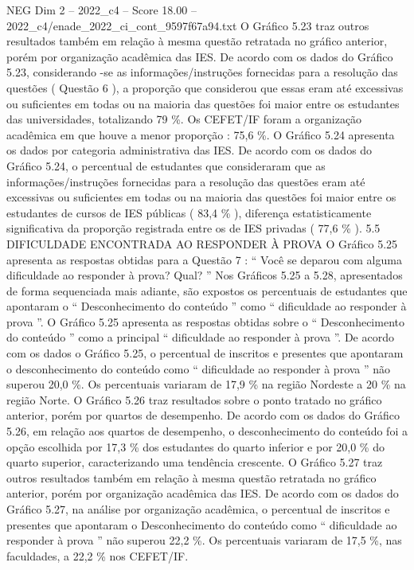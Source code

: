 \begin{textsample}{NEG Dim 2 – 2022\_c4 – Score 18.00 – 2022\_c4/enade\_2022\_ci\_cont\_9597f67a94.txt}
O Gráfico 5.23 traz outros resultados também em relação à mesma questão retratada no gráfico anterior, porém por organização acadêmica das IES.
De acordo com os dados do Gráfico 5.23, considerando -se as informações/instruções fornecidas para a resolução das questões ( Questão 6 ), a proporção que considerou que essas eram até excessivas ou suficientes em todas ou na maioria das questões foi maior entre os estudantes das universidades, totalizando 79 \%.
Os CEFET/IF foram a organização acadêmica em que houve a menor proporção : 75,6 \%.
O Gráfico 5.24 apresenta os dados por categoria administrativa das IES.
De acordo com os dados do Gráfico 5.24, o percentual de estudantes que consideraram que as informações/instruções fornecidas para a resolução das questões eram até excessivas ou suficientes em todas ou na maioria das questões foi maior entre os estudantes de cursos de IES públicas ( 83,4 \% ), diferença estatisticamente significativa da proporção registrada entre os de IES privadas ( 77,6 \% ). 5.5 DIFICULDADE ENCONTRADA AO RESPONDER À PROVA O Gráfico 5.25 apresenta as respostas obtidas para a Questão 7 : “ Você se deparou com alguma dificuldade ao responder à prova?
Qual? ” Nos Gráficos 5.25 a 5.28, apresentados de forma sequenciada mais adiante, são expostos os percentuais de estudantes que apontaram o “ Desconhecimento do conteúdo ” como “ dificuldade ao responder à prova ”.
O Gráfico 5.25 apresenta as respostas obtidas sobre o “ Desconhecimento do conteúdo ” como a principal “ dificuldade ao responder à prova ”.
De acordo com os dados o Gráfico 5.25, o percentual de inscritos e presentes que apontaram o desconhecimento do conteúdo como “ dificuldade ao responder à prova ” não superou 20,0 \%.
Os percentuais variaram de 17,9 \% na região Nordeste a 20 \% na região Norte.
O Gráfico 5.26 traz resultados sobre o ponto tratado no gráfico anterior, porém por quartos de desempenho.
De acordo com os dados do Gráfico 5.26, em relação aos quartos de desempenho, o desconhecimento do conteúdo foi a opção escolhida por 17,3 \% dos estudantes do quarto inferior e por 20,0 \% do quarto superior, caracterizando uma tendência crescente.
O Gráfico 5.27 traz outros resultados também em relação à mesma questão retratada no gráfico anterior, porém por organização acadêmica das IES.
De acordo com os dados do Gráfico 5.27, na análise por organização acadêmica, o percentual de inscritos e presentes que apontaram o Desconhecimento do conteúdo como “ dificuldade ao responder à prova ” não superou 22,2 \%.
Os percentuais variaram de 17,5 \%, nas faculdades, a 22,2 \% nos CEFET/IF.

\end{textsample}
